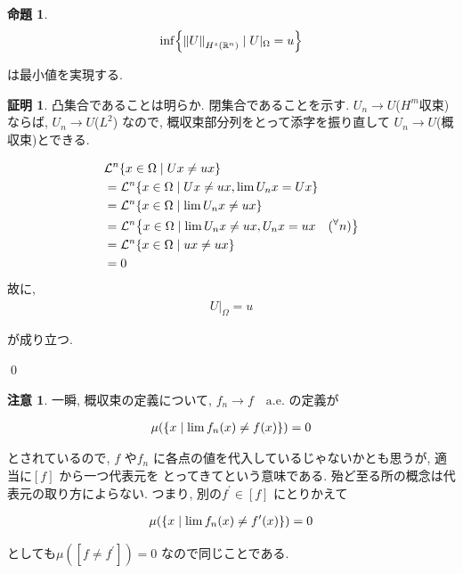 \documentclass[10pt, fleqn, label-section=none]{bxjsarticle}
\theoremstyle{definition}
\newtheorem{prop}[dfn]{命題}
\newtheorem*{pf*}{証明}
\newtheorem{remark}[dfn]{注意}
\newcommand{\any}{{}^{\forall}}
\newcommand{\cbra}[1]{\mleft\{#1\mright\}}
\newcommand{\norm}[1]{\left\|#1\right\|}
\renewcommand{\;}{\, ; \,}
\begin{document}
\begin{prop}

\begin{align*} \inf \cbra{ \norm{U}_{H^s(\mathbb R^n)} \mid U|_\Omega = u } \end{align*}

は最小値を実現する. 

\end{prop}
\begin{pf*}
凸集合であることは明らか. 閉集合であることを示す. $U_n \rightarrow U $($H^m$収束)ならば, $U_n \rightarrow U$($L^2$) なので, 概収束部分列をとって添字を振り直して
$U_n \rightarrow U$(概収束)とできる. 

\begin{align*} &\mathcal L^n \cbra{x \in \Omega \mid Ux \neq ux } 
\\&= \mathcal L^n \cbra{x \in \Omega \mid Ux \neq ux , \lim U_n x = Ux}
\\&= \mathcal L^n \cbra{x \in \Omega \mid \lim U_n x \neq ux } 
\\&= \mathcal L^n \cbra{x \in \Omega \mid \lim U_n x \neq ux, U_n x = ux \quad (\any n)}
\\&= \mathcal L^n \cbra{x \in \Omega \mid ux \neq ux} 
\\&= 0
 \end{align*}
故に, 
\begin{align*} U|_\Omega = u \end{align*}

が成り立つ. 

\qed
\end{pf*}

\begin{remark}一瞬, 概収束の定義について, $f_n \rightarrow f\quad \textrm{a.e.}$ の定義が

\begin{align*} \mu (\cbra{x \mid \lim f_n(x) \neq f(x)} ) = 0\end{align*}

とされているので, $f$ や$f_n$ に各点の値を代入しているじゃないかとも思うが, 適当に$[f]$ から一つ代表元を とってきてという意味である. 殆ど至る所の概念は代表元の取り方によらない. つまり, 別の$f^\prime \in [f]$ にとりかえて

\begin{align*} \mu (\cbra{x \mid \lim f_n(x) \neq f^\prime (x)} ) = 0\end{align*}

としても$\mu([f \neq f^\prime]) = 0$ なので同じことである. 

\end{remark}
\end{document}
